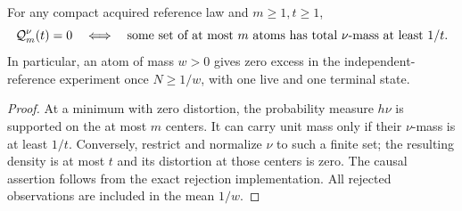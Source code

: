 \begin{proposition}\label{prop:atoms}
For any compact acquired reference law and $m\ge1,t\ge1$,
\begin{equation}\label{eq:atom-threshold}
 \mathcal Q_m^\nu(t)=0
 \quad\Longleftrightarrow\quad
 \text{some set of at most $m$ atoms has total $\nu$-mass at least $1/t$.}
\end{equation}
In particular, an atom of mass $w>0$ gives zero excess in the independent-reference experiment once $N\ge1/w$, with one live and one terminal state.
\end{proposition}
\begin{proof}
At a minimum with zero distortion, the probability measure $h\nu$ is supported on the at most $m$ centers. It can carry unit mass only if their $\nu$-mass is at least $1/t$. Conversely, restrict and normalize $\nu$ to such a finite set; the resulting density is at most $t$ and its distortion at those centers is zero. The causal assertion follows from the exact rejection implementation. All rejected observations are included in the mean $1/w$.
\end{proof}
